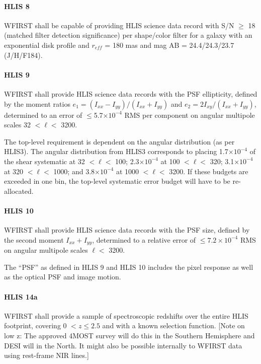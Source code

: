 \paragraph{HLIS 8} WFIRST shall be capable of providing HLIS science data record
with S/N $\geq$ 18 (matched filter detection significance) per shape/color filter for
a galaxy with an exponential disk profile and $r_{eff}$ = 180 mas and mag AB =
24.4/24.3/23.7 (J/H/F184).

\paragraph{HLIS 9} WFIRST shall provide HLIS science data records with the PSF
ellipticity, defined by the moment ratios $e_1=(I_{xx}-I_{yy})/(I_{xx}+I_{yy})$ and
$e_2=2I_{xy}/(I_{xx}+I_{yy})$, determined to an error of $\leq$5.7$\times 10^{−4}$ RMS per component on
angular multipole scales 32 $< \ell <$ 3200.

The top-level requirement is dependent on the angular distribution (as per
HLIS3). The angular distribution from HLIS3 corresponds to placing 1.7$\times
10^{−4}$ of the shear systematic at 32 $< \ell <$ 100; 2.3$\times 10^{−4}$ at
100 $< \ell <$ 320; 3.1$\times 10^{−4}$ at 320 $< \ell <$ 1000; and 3.8$\times 10^{−4}$
at 1000 $< \ell <$ 3200. If these budgets are exceeded in one bin, the top-level
systematic error budget will have to be re-allocated.

\paragraph{HLIS 10} WFIRST shall provide HLIS science data records with the PSF
size, defined by the second moment $I_{xx}+I_{yy}$, determined to a relative
error of $\leq 7.2 \times 10^{−4}$ RMS on angular multipole scales $\ell <$
3200.

The “PSF” as defined in HLIS 9 and HLIS 10 includes the pixel response as well
as the optical PSF and image motion.

\paragraph{HLIS 14a} WFIRST shall provide a sample of spectroscopic redshifts
over the entire HLIS footprint, covering 0 $< z \leq 2.5$ and with a known selection
function.  [Note on low z: The approved 4MOST survey will do this in the
Southern Hemisphere and DESI will in the North. It might also be possible
internally to WFIRST data using rest-frame NIR lines.]

